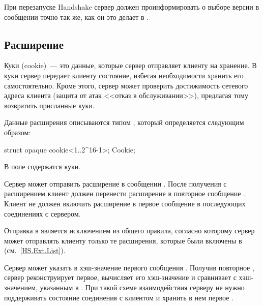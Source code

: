При перезапуске Handshake сервер должен проинформировать о выборе версии в
сообщении  точно так же, как он это делает в
.


\subsection{Расширение }\label{HS.Ext.c}

Куки (cookie)~--- это данные, которые сервер отправляет клиенту на хранение. 
%
В куки сервер передает клиенту состояние, избегая необходимости хранить 
его самостоятельно.
%
Кроме этого, сервер может проверить достижимость сетевого адреса клиента 
(защита от атак <<отказ в обслуживании>>), предлагая тому возвратить присланные 
куки.

Данные расширения  описываются типом , который 
определяется следующим образом:

\begin{codeblock}
struct {
  opaque cookie<1..2^16-1>;
} Cookie;
\end{codeblock}

В поле  содержатся куки.

Сервер может отправить расширение  в сообщении
. 
%
После получения  с расширением  
клиент должен перенести расширение в повторное сообщение 
.
%
Клиент не должен включать расширение в первое сообщение 
 в последующих соединениях с сервером.

\begin{note}
Отправка  в  является исключением 
из общего правила, согласно которому сервер может отправлять клиенту только те 
расширения, которые были включены в 
(см.~\ref{HS.Ext.List}).
\end{note}

Сервер может указать в  хэш-значение первого сообщения
. Получив повторное ,
сервер реконструирует первое, вычисляет его хэш-значение и сравнивает с 
хэш-значением, указанным в . При такой схеме взаимодействия 
серверу не нужно поддерживать состояние соединения с клиентом и хранить в нем 
первое .


